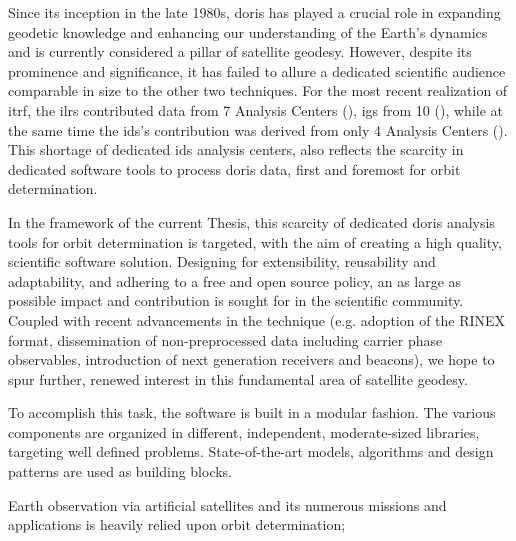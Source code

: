 Since its inception in the late 1980s, \gls{doris} has  played a crucial role in expanding
geodetic knowledge and enhancing our understanding of the Earth’s dynamics and is currently
considered a pillar of satellite geodesy. However, despite its prominence and significance,
it has failed to allure a dedicated scientific audience comparable in size to the other two
techniques. For the most recent realization of \gls{itrf}, the \gls{ilrs} contributed data
from 7 Analysis Centers (\cite{Pavlis2023}), \gls{igs} from 10 (\cite{Rebischung2021}), while
at the same time the \gls{ids}'s contribution was derived from only 4 Analysis Centers
(\cite{Moreaux2022}). This shortage of dedicated \gls{ids} analysis centers, also reflects the
scarcity in dedicated software tools to process \gls{doris} data, first and foremost for
orbit determination.

In the framework of the current Thesis, this scarcity of dedicated \gls{doris}
analysis tools for orbit determination is targeted, with the aim of creating
a high quality, scientific software solution. Designing for extensibility, reusability
and adaptability, and adhering to a free and open source policy, an as large as possible
impact and contribution is sought for in the scientific community. Coupled with recent
advancements in the technique (e.g. adoption of the RINEX format, dissemination of
non-preprocessed data including carrier phase observables, introduction of next generation
receivers and beacons), we hope to spur further, renewed interest in this fundamental
area of satellite geodesy.

To accomplish this task, the software is built in a modular fashion. The various components
are organized in different, independent, moderate-sized libraries, targeting well defined
problems. State-of-the-art models, algorithms and design patterns are used as building
blocks.

Earth observation via artificial satellites and its numerous
missions and applications is heavily relied upon orbit determination;
